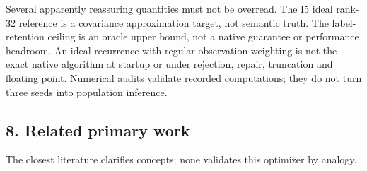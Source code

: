 \documentclass[
  british,
  10pt,
  a4paper,
]{article}
\newcounter{none} %
\begin{document}
Several apparently reassuring quantities must not be overread. The I5
ideal rank-32 reference is a covariance approximation target, not
semantic truth. The label-\allowbreak{}retention ceiling is an oracle
upper bound, not a native guarantee or performance headroom. An ideal
recurrence with regular observation weighting is not the exact native
algorithm at startup or under rejection, repair, truncation and floating
point. Numerical audits validate recorded computations; they do not turn
three seeds into population inference.

\subsection{8. Related primary
work}\label{synthesis--related-primary-work}

The closest literature clarifies concepts; none validates this optimizer
by analogy.
\end{document}
